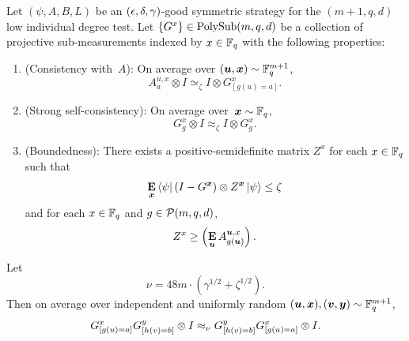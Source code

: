 \begin{lemma}
  \label{lem:comm-data-processed-g}
  Let $(\psi, A, B, L)$ be an $(\epsilon, \delta, \gamma)$-good symmetric strategy for the $(m+1,q,d)$ low individual degree test.
  Let $\{G^x\} \in \mathrm{PolySub}(m, q, d)$ be a collection of projective sub-measurements indexed by $x \in \mathbb F_q$ with the following properties:
  \begin{enumerate}
  \item (Consistency with~$A$): \label{item:data-processed-consistency} On average over $(\boldsymbol{u}, {\boldsymbol{x}}) \sim \mathbb F_q^{m+1}$,
	  \begin{equation*}
	  A^{u, x}_a \otimes I \simeq_{\zeta} I \otimes G^x_{[g(u)=a]}.
	  \end{equation*}
  \item (Strong self-consistency): \label{item:data-processed-self-consistency} On average over~${\boldsymbol{x}} \sim \mathbb F_q$,
  	\begin{equation*}
		G^x_g \otimes I \approx_{\zeta} I \otimes G^x_g.
	\end{equation*}
  \item (Boundedness): \label{item:data-processed-boundedness} There exists a positive-semidefinite matrix $Z^x$ for each $x \in \mathbb F_q$ such that
  	\begin{equation*}
		\mathop{\bf E\/}_{{\boldsymbol{x}}} \bra{\psi} (I-G^{{\boldsymbol{x}}})\otimes Z^{{\boldsymbol{x}}} \ket{\psi} \leq \zeta
	\end{equation*}
	and for each $x \in \mathbb F_q$ and $g \in \mathcal{P}(m, q, d)$,
	\begin{equation*}
	 Z^x \geq \left(\mathop{\bf E\/}_{\boldsymbol{u}} A^{\boldsymbol{u}, x}_{g(\boldsymbol{u})}\right).
	\end{equation*}
  \end{enumerate}
  Let
  \begin{equation*}
  \nu = 48 m \cdot (\gamma^{1/2} + \zeta^{1/2}).
  \end{equation*}
  Then on average over independent and uniformly random $(\boldsymbol{u},{\boldsymbol{x}}), (\boldsymbol{v},\boldsymbol{y}) \sim \mathbb F_q^{m+1}$,
  \begin{equation*}
    G^x_{[g(u) = a]} G^y_{[h(v) = b]} \otimes I \approx_{\nu} G^y_{[h(v) = b]}
    G^x_{[g(u) = a]} \otimes I.
  \end{equation*}
\end{lemma}

